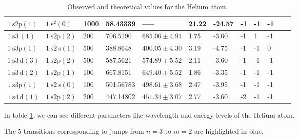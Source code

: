 \begin{table}
\begin{adjustwidth}{-1cm}{-1cm}
\begin{adjustbox}{width=1.75\textwidth, center}
\begin{tabular}{|l|l|l|l|l|l|l|l|l|l|l|l|}
                \hline $1 \mathrm{~s} 2 \mathrm{p}(1)$                      & $1 \mathrm{~s}^2(0)$             & 1000               & 58.43339                                  & -----                            & 21.22                         & -24.57                        & -1                 & -1                 & -1 \\
                \hline \cellcolor{blue!25} $1 \mathrm{~s} 3 \mathrm{~}(1)$  & $1 \mathrm{~s} 2 \mathrm{p}(2)$  & 200                & 706.5190                                  & $685.06 \pm 4.91$                & 1.75                          & -3.60                         & -1                 & 1                  & -1 \\
                \hline \cellcolor{blue!25}  $1 \mathrm{~s} 3 \mathrm{p}(1)$ & $1 \mathrm{~s} 2 \mathrm{~s}(1)$ & 500                & 388.8648                                  & $400.05 \pm 4.30$                & 3.19                          & -4.75                         & -1                 & -1                 & 0  \\
                \hline \cellcolor{blue!25} $1 \mathrm{~s} 3 \mathrm{~d}(3)$ & $1 \mathrm{~s} 2 \mathrm{p}(2)$  & 500                & 587.5621                                  & $574.89 \pm 5.52$                & 2.11                          & -3.60                         & -1                 & -1                 & -1 \\
                \hline \cellcolor{blue!25} $1 \mathrm{~s} 3 \mathrm{~d}(2)$ & $1 \mathrm{~s} 2 \mathrm{p}(1)$  & 100                & 667.8151                                  & $649.40 \pm 5.52$                & 1.86                          & -3.35                         & -1                 & -1                 & -1 \\
                \hline \cellcolor{blue!25} $1 \mathrm{~s} 3 \mathrm{p}(1)$  & $1 \mathrm{~s} 2 \mathrm{~s}(0)$ & 100                & 501.56783                                 & $498.61 \pm 3.68$                & 2.47                          & -3.95                         & -1                 & -1                 & -1 \\
                \hline $1 \mathrm{~s} 4 \mathrm{~d}(1)$                     & $1 \mathrm{~s} 2 \mathrm{p}(2)$  & 200                & 447.14802                                 & $451.34 \pm 3.07$                & 2.77                          & -3.60                         & -2                 & -1                 & -1 \\
                \hline
            \end{tabular}

        \end{adjustbox}

    \end{adjustwidth}
    \caption{Observed and theoretical values for the Helium atom.}
    \label{tab:heliumSpectra}
\end{table}

In table \ref{tab:heliumSpectra}, we can see different parameters like wavelength and energy levels of the Helium atom.

The 5 transitions corresponding to jumps from $n = 3$ to $m = 2$ are highlighted in {\colorbox{blue!25} {blue}}.
